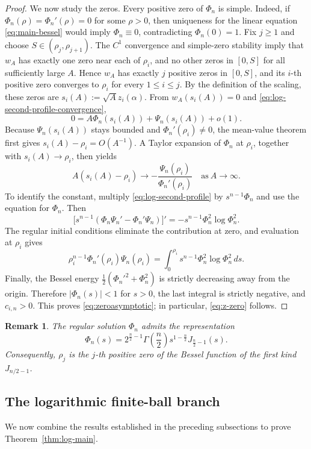 \documentclass[11pt]{article}
\newtheorem*{remark*}{Remark}
\begin{document}
\begin{proof}
We now study the zeros. Every positive zero of $\Phi_n$ is simple.
Indeed, if  $\Phi_n(\rho)=\Phi_n'(\rho)=0$ for some $\rho>0$, then uniqueness for the linear equation \eqref{eq:main-bessel} would imply $\Phi_n\equiv0$, contradicting $\Phi_n(0)=1$. Fix $j\geq1$ and choose $S\in(\rho_j,\rho_{j+1})$.
{The $C^1$ convergence and simple-zero stability} imply that
$w_A$ has exactly one zero near each of $\rho_i$, and no other zeros
in $[0,S]$ for all sufficiently large $A$. Hence $w_A$ has exactly $j$
positive zeros in $[0,S]$, and its $i$-th positive zero converges to
$\rho_i$ for every $1\leq i\leq j$. By the definition of the scaling,
these zeros are $s_i(A):=\sqrt A z_i(\alpha)$. {From $w_A(s_i(A))=0$ and
\eqref{eq:log-second-profile-convergence},
\[
 0=A\Phi_n(s_i(A))+\Psi_n(s_i(A))+o(1).
\]
Because $\Psi_n(s_i(A))$ stays bounded and $\Phi_n'(\rho_i)\ne0$, the
mean-value theorem first gives $s_i(A)-\rho_i=O(A^{-1})$.  A Taylor
expansion of $\Phi_n$ at $\rho_i$, together with
$s_i(A)\to\rho_i$, then yields}
\begin{equation*}
 A(s_i(A)-\rho_i)\longrightarrow
 -\frac{\Psi_n(\rho_i)}{\Phi_n'(\rho_i)}\quad \text{as}~A\rightarrow\infty.
\end{equation*}
To identify the constant, multiply \eqref{eq:log-second-profile} by
$s^{n-1}\Phi_n$ and use the equation for $\Phi_n$. Then
\[
 \bigl[s^{n-1}(\Phi_n\Psi_n'-\Phi_n'\Psi_n)\bigr]'
 =-s^{n-1}\Phi_n^2\log\Phi_n^2.
\]
The regular initial conditions eliminate the contribution at zero, and
evaluation at $\rho_i$ gives
\[
 \rho_i^{n-1}\Phi_n'(\rho_i)\Psi_n(\rho_i)
 =\int_0^{\rho_i}s^{n-1}\Phi_n^2\log\Phi_n^2\,ds.
\]
Finally, the Bessel energy $\frac12(\Phi_n'^2+\Phi_n^2)$ is strictly
decreasing away from the origin. Therefore $|\Phi_n(s)|<1$ for $s>0$,
the last integral is strictly negative, and $c_{i,n}>0$. This proves
\eqref{eq:zeroasymptotic}; in particular, \eqref{eq:z-zero} follows.
\end{proof}

\begin{remark*}
{\rm The regular solution $\Phi_n$ admits the representation
\[
 \Phi_n(s)=2^{\frac n2-1}\Gamma\!\left(\frac n2\right)
 s^{1-\frac n2}J_{\frac n2-1}(s).
\]
Consequently, $\rho_j$ is the $j$-th positive zero of the Bessel function of the first kind $J_{n/2-1}$.}
\end{remark*}


\subsection{The logarithmic finite-ball branch}
We now combine the results established in the preceding subsections to prove Theorem~\ref{thm:log-main}.
\end{document}
